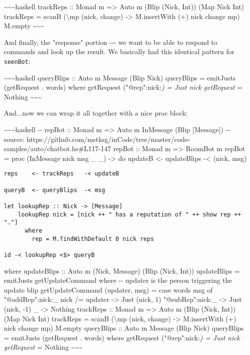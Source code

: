 \documentclass[]{article}
\begin{document}
\textasciitilde{}\textasciitilde{}\textasciitilde{}haskell trackReps :: Monad m
=\textgreater{} Auto m (Blip (Nick, Int)) (Map Nick Int) trackReps = scanB
(\textbackslash{}mp (nick, change) -\textgreater{} M.insertWith (+) nick change
mp) M.empty \textasciitilde{}\textasciitilde{}\textasciitilde{}

And finally, the "response" portion -\/-\/- we want to be able to respond to
commands and look up the result. We basically had this identical pattern for
\texttt{seenBot}:

\textasciitilde{}\textasciitilde{}\textasciitilde{}haskell queryBlips :: Auto m
Message (Blip Nick) queryBlips = emitJusts (getRequest . words) where getRequest
("@rep":nick:\emph{) = Just nick getRequest } = Nothing
\textasciitilde{}\textasciitilde{}\textasciitilde{}

And...now we can wrap it all together with a nice proc block:

\textasciitilde{}\textasciitilde{}\textasciitilde{}haskell -\/- repBot :: Monad
m =\textgreater{} Auto m InMessage (Blip {[}Message{]}) -\/- source:
https://github.com/mstksg/inCode/tree/master/code-samples/auto/chatbot.hs\#L117-147
repBot :: Monad m =\textgreater{} RoomBot m repBot = proc (InMessage nick msg \_
\_) -\textgreater{} do updateB \textless{}- updateBlips -\textless{} (nick, msg)

\begin{verbatim}
reps    <- trackReps   -< updateB

queryB  <- queryBlips  -< msg

let lookupRep :: Nick -> [Message]
    lookupRep nick = [nick ++ " has a reputation of " ++ show rep ++ "."]
      where
        rep = M.findWithDefault 0 nick reps

id -< lookupRep <$> queryB
\end{verbatim}

where updateBlips :: Auto m (Nick, Message) (Blip (Nick, Int)) updateBlips =
emitJusts getUpdateCommand where -\/- updater is the person triggering the
update blip getUpdateCommand (updater, msg) = case words msg of
"@addRep":nick:\_ \textbar{} nick /= updater -\textgreater{} Just (nick, 1)
"@subRep":nick:\_ -\textgreater{} Just (nick, -1) \_ -\textgreater{} Nothing
trackReps :: Monad m =\textgreater{} Auto m (Blip (Nick, Int)) (Map Nick Int)
trackReps = scanB (\textbackslash{}mp (nick, change) -\textgreater{}
M.insertWith (+) nick change mp) M.empty queryBlips :: Auto m Message (Blip
Nick) queryBlips = emitJusts (getRequest . words) where getRequest
("@rep":nick:\emph{) = Just nick getRequest } = Nothing
\textasciitilde{}\textasciitilde{}\textasciitilde{}
\end{document}
